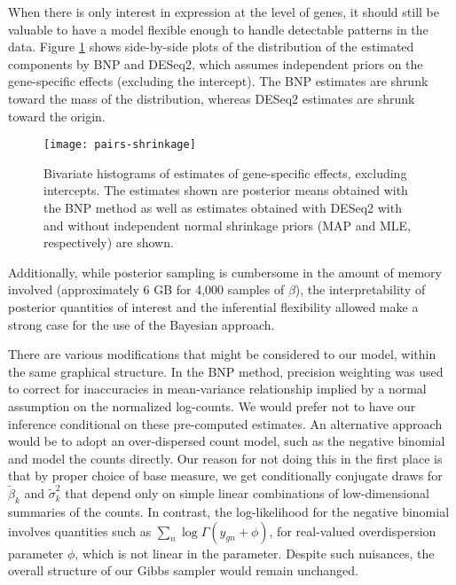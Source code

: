 When there is only interest in expression at the level of genes, it should still be valuable to have a model flexible enough to handle detectable patterns in the data. Figure \ref{all-shrink} shows side-by-side plots of the distribution of the estimated components by BNP and DESeq2, which assumes independent priors on the gene-specific effects (excluding the intercept). The BNP estimates are shrunk toward the mass of the distribution, whereas DESeq2 estimates are shrunk toward the origin.


\begin{landscape}
\begin{figure}
\centering
\texttt{[image: pairs-shrinkage]}
\caption{Bivariate histograms of estimates of gene-specific effects, excluding intercepts. The estimates shown are posterior means obtained with the BNP method as well as estimates obtained with DESeq2 with and without independent normal shrinkage priors (MAP and MLE, respectively) are shown.}
\label{all-shrink}
\end{figure}
\end{landscape}

Additionally, while posterior sampling is cumbersome in the amount of memory involved (approximately 6 GB for 4,000 samples of $\beta$), the interpretability of posterior quantities of interest and the inferential flexibility allowed make a strong case for the use of the Bayesian approach.



There are various modifications that might be considered to our model, within the same graphical structure. In the BNP method, precision weighting was used to correct for inaccuracies in mean-variance relationship implied by a normal assumption on the normalized log-counts. We would prefer not to have our inference conditional on these pre-computed estimates. An alternative approach would be to adopt an over-dispersed count model, such as the negative binomial and model the counts directly. Our reason for not doing this in the first place is that by proper choice of base measure, we get conditionally conjugate draws for $\tilde{\beta}_k$ and $\tilde{\sigma}^2_k$ that depend only on simple linear combinations of low-dimensional summaries of the counts. In contrast, the log-likelihood for the negative binomial involves quantities such as $\sum_n \log \Gamma(y_{gn}+\phi)$, for real-valued overdispersion parameter $\phi$, which is not linear in the parameter. Despite such nuisances, the overall structure of our Gibbs sampler would remain unchanged.

